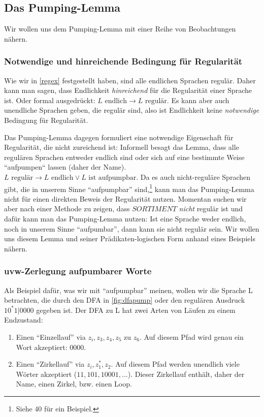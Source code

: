 \subsection{Das Pumping-Lemma}

Wir wollen uns dem Pumping-Lemma mit einer Reihe von Beobachtungen nähern.

\subsubsection{Notwendige und hinreichende Bedingung für Regularität}

Wie wir in \autoref{regex} festgestellt haben, sind alle endlichen Sprachen regulär.
Daher kann man sagen, dass Endlichkeit \emph{hinreichend} für die Regularität einer Sprache ist.
Oder formal ausgedrückt: $L \text{ endlich} \rightarrow L \text{ regulär}$.
Es kann aber auch unendliche Sprachen geben, die regulär sind,
also ist Endlichkeit keine \emph{notwendige} Bedingung für Regularität.

Das Pumping-Lemma dagegen formuliert eine notwendige Eigenschaft für Regularität,
die nicht zureichend ist:
Informell besagt das Lemma,
dass alle regulären Sprachen entweder endlich sind
oder sich auf eine bestimmte Weise ``aufpumpen`` lassen (daher der Name).
 $L \text{ regulär} \rightarrow L \text{ endlich} \vee L \text{ ist aufpumpbar}$.
Da es auch nicht-reguläre Sprachen gibt, die in unserem Sinne ``aufpumpbar'' sind,\footnote{
    Siehe \cite{schoening} 40 für ein Beispiel.}
kann man das Pumping-Lemma nicht für einen direkten Beweis der Regularität nutzen.
Momentan suchen wir aber nach einer Methode zu zeigen,
dass $SORTIMENT$ \emph{nicht} regulär ist
und dafür kann man das Pumping-Lemma nutzen:
Ist eine Sprache weder endlich, noch in unserem Sinne ``aufpumbar'',
dann kann sie nicht regulär sein.
Wir wollen uns diesem Lemma und seiner Prädikaten-logischen Form anhand eines Beispiels nähern.

\subsubsection{uvw-Zerlegung aufpumbarer Worte}

Als Beispiel dafür, was wir mit ``aufpumpbar'' meinen,
wollen wir die Sprache L betrachten, die durch den DFA in \autoref{fig:dfapump}
oder den regulären Ausdruck $10^*1|0000$ gegeben ist.
Der DFA zu L hat zwei Arten von Läufen zu einem Endzustand:
\begin{enumerate}
    \item Einen ``Einzellauf'' via $z_i, z_3, z_4, z_5$ zu $z_6$.
        Auf diesem Pfad wird genau ein Wort akzeptiert: $0000$.
    \item Einen ``Zirkellauf'' via $z_i, z_1^*, z_2$.
        Auf diesem Pfad werden unendlich viele Wörter akzeptiert ($11, 101, 10001, \ldots$).
        Dieser Zirkellauf enthält, daher der Name, einen Zirkel, bzw. einen Loop.
\end{enumerate}

